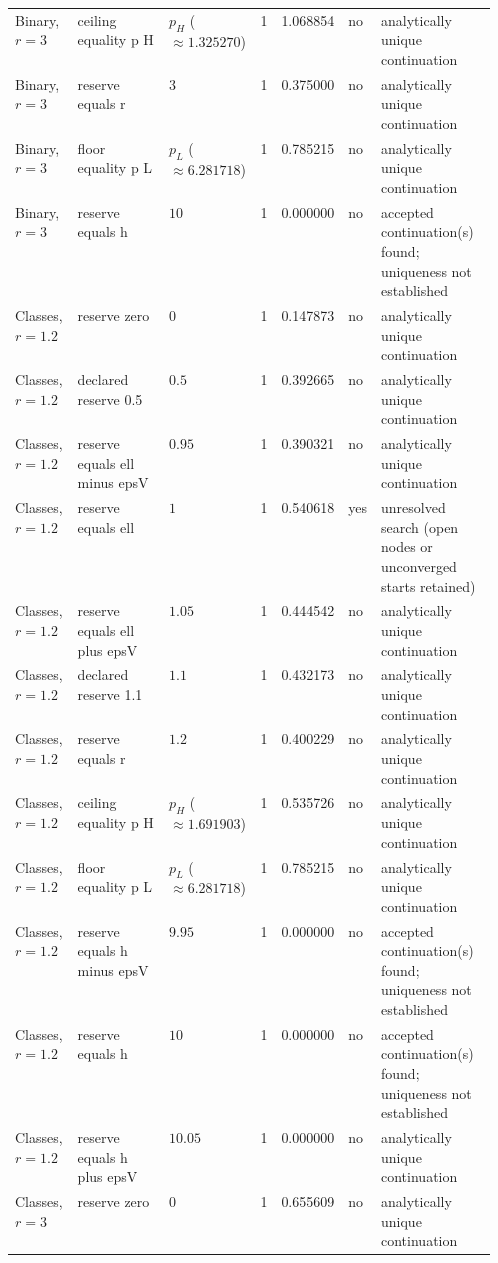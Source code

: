 \begin{landscape}
\begin{longtable}{@{}p{0.13\linewidth}p{0.19\linewidth}lrrlp{0.24\linewidth}@{}}
Binary, $r=3$ & ceiling equality p H & $p_H$ ($\approx 1.325270$) & 1 & 1.068854 & no & analytically unique continuation \\
Binary, $r=3$ & reserve equals r & $3$ & 1 & 0.375000 & no & analytically unique continuation \\
Binary, $r=3$ & floor equality p L & $p_L$ ($\approx 6.281718$) & 1 & 0.785215 & no & analytically unique continuation \\
Binary, $r=3$ & reserve equals h & $10$ & 1 & 0.000000 & no & accepted continuation(s) found; uniqueness not established \\
Classes, $r=1.2$ & reserve zero & $0$ & 1 & 0.147873 & no & analytically unique continuation \\
Classes, $r=1.2$ & declared reserve 0.5 & $0.5$ & 1 & 0.392665 & no & analytically unique continuation \\
Classes, $r=1.2$ & reserve equals ell minus epsV & $0.95$ & 1 & 0.390321 & no & analytically unique continuation \\
Classes, $r=1.2$ & reserve equals ell & $1$ & 1 & 0.540618 & yes & unresolved search (open nodes or unconverged starts retained) \\
Classes, $r=1.2$ & reserve equals ell plus epsV & $1.05$ & 1 & 0.444542 & no & analytically unique continuation \\
Classes, $r=1.2$ & declared reserve 1.1 & $1.1$ & 1 & 0.432173 & no & analytically unique continuation \\
Classes, $r=1.2$ & reserve equals r & $1.2$ & 1 & 0.400229 & no & analytically unique continuation \\
Classes, $r=1.2$ & ceiling equality p H & $p_H$ ($\approx 1.691903$) & 1 & 0.535726 & no & analytically unique continuation \\
Classes, $r=1.2$ & floor equality p L & $p_L$ ($\approx 6.281718$) & 1 & 0.785215 & no & analytically unique continuation \\
Classes, $r=1.2$ & reserve equals h minus epsV & $9.95$ & 1 & 0.000000 & no & accepted continuation(s) found; uniqueness not established \\
Classes, $r=1.2$ & reserve equals h & $10$ & 1 & 0.000000 & no & accepted continuation(s) found; uniqueness not established \\
Classes, $r=1.2$ & reserve equals h plus epsV & $10.05$ & 1 & 0.000000 & no & analytically unique continuation \\
Classes, $r=3$ & reserve zero & $0$ & 1 & 0.655609 & no & analytically unique continuation \\

\end{longtable}
\end{landscape}
